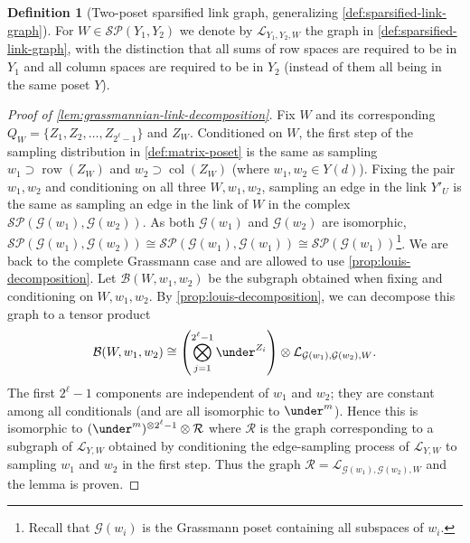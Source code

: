 \documentclass[10pt,a4paper]{article}
\newcommand{\prettyref}[1]{\cref{#1}}
\theoremstyle{definition}
\newtheorem{definition}[theorem]{Definition}
\theoremstyle{remark}
\newcommand{\set}[1]{\{#1\}}
\DeclareMathOperator{\row}{row}
\DeclareMathOperator{\col}{col}
\numberwithin{equation}{section}
\let\pref=\prettyref
\def\Gr{\mathcal{G}}
\def\Y{Y}
\def\SL{\mathcal{L}}
\def\diml{d}
\def\dimlin{{\diml}}
\def\dimm{\ell}
\def\M{\mathcal{SP}}
\begin{document}
\begin{definition}[Two-poset sparsified link graph, generalizing \pref{def:sparsified-link-graph}]
    For \(W \in \M(\Y_1,\Y_2)\) we denote by \(\SL_{\Y_1,\Y_2,W}\) the graph in \pref{def:sparsified-link-graph}, with the distinction that all sums of row spaces are required to be in \(\Y_1\) and all column spaces are required to be in \(\Y_2\) (instead of them all being in the same poset \(\Y\)).
\end{definition}
 
\begin{proof}[Proof of \pref{lem:grassmannian-link-decomposition}]
    Fix \(W\) and its corresponding \(Q_W = \set{Z_1,Z_2,\dots,Z_{2^{\dimm}-1}}\) and \(Z_W\). Conditioned on \(W\), the first step of the sampling distribution in \pref{def:matrix-poset} is the same as sampling \(w_1 \supset \row(Z_W)\) and \(w_2 \supset \col(Z_W)\) (where \(w_1,w_2 \in \Y(\dimlin)\)). Fixing the pair \(w_1,w_2\) and conditioning on all three \(W,w_1,w_2\), sampling an edge in the link \(\Y'_U\) is the same as sampling an edge in the link of \(W\) in the complex \(\M(\Gr(w_1),\Gr(w_2))\). As both \(\Gr(w_1)\) and \(\Gr(w_2)\) are isomorphic, \(\M(\Gr(w_1),\Gr(w_2)) \cong \M(\Gr(w_1),\Gr(w_1)) \cong \M(\Gr(w_1))\)\footnote{Recall that \(\Gr(w_i)\) is the Grassmann poset containing all subspaces of \(w_i\).}. We are back to the complete Grassmann case and are allowed to use \pref{prop:louis-decomposition}.
    Let \(\mathcal{B}(W,w_1,w_2)\) be the subgraph obtained when fixing and conditioning on \(W,w_1,w_2\). By \pref{prop:louis-decomposition}, we can decompose this graph to a tensor product  
    \[\mathcal{B}(W,w_1,w_2) \cong \left ( \bigotimes_{j=1}^{2^\dimm-1} \under^{Z_i} \right )\otimes \SL_{\Gr(w_1),\Gr(w_2),W}.\] %
    The first \(2^{\dimm}-1\) components are independent of \(w_1\) and \(w_2\); they are constant among all conditionals (and are all isomorphic to \(\under^{m}\)). Hence this is isomorphic to \( (\under^{m})^{\otimes 2^{\dimm}-1} \otimes \mathcal{R}\) where \(\mathcal{R}\) is the graph corresponding to a subgraph of \(\SL_{\Y,W}\) obtained by conditioning the edge-sampling process of \(\SL_{\Y,W}\) to sampling \(w_1\) and \(w_2\) in the first step. Thus the graph \(\mathcal{R} = \SL_{\Gr(w_1),\Gr(w_2),W}\) and the lemma is proven.
\end{proof}
\end{document}
